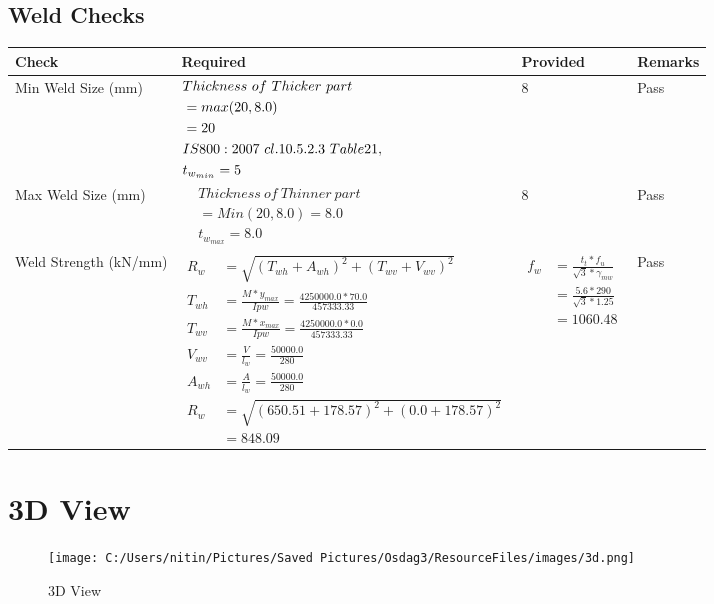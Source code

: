 \documentclass{article}%
\begin{document}
\subsection{Weld Checks}%
\label{subsec:WeldChecks}%
\renewcommand{\arraystretch}{1.2}%
\begin{longtable}{|p{4cm}|p{7.0cm}|p{3.5cm}|p{1.5cm}|}%
\hline%
\rowcolor{OsdagGreen}%
Check&Required&Provided&Remarks\\%
\hline%
\endhead%
\hline%
Min Weld Size (mm)&$\begin{aligned} &Thickness~of~Thicker~part\\ \noindent &=max(20,8.0)\\ &=20\\ &IS800:2007~cl.10.5.2.3~Table 21,\\  &t_{w_{min}}=5\end{aligned}$&8&Pass\\%
\hline%
Max Weld Size (mm)&$\begin{aligned} & Thickness~of~Thinner~part\\ &=Min(20,8.0)=8.0\\ &t_{w_{max}} =8.0\end{aligned}$&8&Pass\\%
\hline%
Weld Strength (kN/mm)&$\begin{aligned} R_w&=\sqrt{(T_{wh}+A_{wh})^2 + (T_{wv}+V_{wv})^2}\\ T_{wh}&=\frac{M*y_{max}}{I{pw}}=\frac{4250000.0*70.0}{457333.33}\\ T_{wv}&=\frac{M*x_{max}}{I{pw}}=\frac{4250000.0*0.0}{457333.33}\\ V_{wv}&=\frac{V}{l_w}=\frac{50000.0}{280}\\ A_{wh}&=\frac{A}{l_w}=\frac{50000.0}{280}\\ R_w&=\sqrt{(650.51+178.57)^2 + (0.0+178.57)^2}\\ &=848.09\end{aligned}$&$\begin{aligned} f_w &=\frac{t_t*f_u}{\sqrt{3}*\gamma_{mw}}\\ &=\frac{5.6*290}{\sqrt{3}*1.25}\\ &=1060.48\end{aligned}$&Pass\\%
\hline%
\end{longtable}

%
%
\newpage%
\section{3D View}%
\label{sec:3DView}%


\begin{figure}[h!]%
\centering%
\texttt{[image: C:/Users/nitin/Pictures/Saved Pictures/Osdag3/ResourceFiles/images/3d.png]}%
\caption{3D View}%
\end{figure}

%
\end{document}
